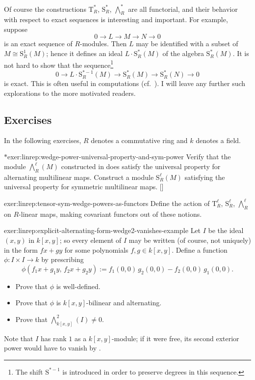 Of course the constructions $\mathrm{T}^*_R$, $\mathrm{S}^*_R$,
$\bigwedge^*_R$ are all functorial, and their behavior with respect to
exact sequences is interesting and important. For example, suppose
\[
  0 \to L \to M \to N \to 0
\]
is an exact sequence of $R$-modules. Then $L$ may be identified with a
subset of $M \cong \mathrm{S}^1_R(M)$; hence it defines an ideal
$L \cdot \mathrm{S}^*_R(M)$ of the algebra $\mathrm{S}^*_R(M)$. It is
not hard to show that the sequence\footnote{The shift
  $\mathrm{S}^{*-1}$ is introduced in order to preserve degrees in
  this sequence.}
\[
  0 \to L \cdot \mathrm{S}^{*-1}_R(M) \to \mathrm{S}^*_R(M) \to
  \mathrm{S}^*_R(N) \to 0
\]
is exact. This is often useful in computations (cf.\
). I will leave
any further such explorations to the more motivated readers.

\subsection*{Exercises}

In the following exercises, $R$ denotes a commutative ring and $k$
denotes a field.

\begin{exer}{$*$}{exer:linrep:wedge-power-universal-property-and-sym-power}
  Verify that the module $\bigwedge^\ell_R(M)$ constructed in
   does satisfy
  the universal property for alternating multilinear maps.  Construct
  a module $\mathrm{S}^\ell_R(M)$ satisfying the universal property
  for symmetric multilinear
  maps. []
\end{exer}

\begin{exer}{}{exer:linrep:tensor-sym-wedge-powers-as-functors}
  Define the action of $\mathrm{T}^\ell_R$, $\mathrm{S}^\ell_R$,
  $\bigwedge^\ell_R$ on $R$-linear maps, making covariant functors out
  of these notions.
\end{exer}

\begin{exer}{}{exer:linrep:explicit-alternating-form-wedge2-vanishes-example}
  Let $I$ be the ideal $(x, y)$ in $k[x, y]$; so every element of $I$
  may be written (of course, not uniquely) in the form $fx + gy$ for
  some polynomials $f, g \in k[x, y]$. Define a function
  $\phi : I \times I \to k$ by prescribing
  \[
    \phi(f_1 x + g_1 y,\, f_2 x + g_2 y) := f_1(0, 0)\, g_2(0, 0) -
    f_2(0, 0)\, g_1(0, 0).
  \]
  \begin{itemize}
  \item Prove that $\phi$ is well-defined.
  \item Prove that $\phi$ is $k[x,y]$-bilinear and alternating.
  \item Prove that $\bigwedge^2_{k[x,y]}(I) \neq 0$.
  \end{itemize}
  Note that $I$ has rank $1$ as a $k[x,y]$-module; if it were free,
  its second exterior power would have to vanish by
  .
\end{exer}

